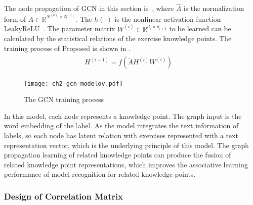 
The node propagation of GCN in this section is~\eqname{\ref{fml:ch2-gcn2}}, where \(\widehat{A}\) is the normalization form of \(A\in \mathbb{R}^{N^{(v)}\times N^{(v)}}\). The \(h(\cdot)\) is the nonlinear activation function LeakyReLU~\cite{maas2013rectifier}. The parameter matrix \(W^{(i)}\in \mathbb{R}^{d_{i}\times d_{i+1}}\) to be learned can be calculated by the statistical relations of the exercise knowledge points. The training process of Proposed is shown in \figname{\ref{fig:ch2-gcn-explain}}.
\begin{align}
    \begin{split}
        H^{(i+1)} = f(\tilde{A}H^{(i)}W^{(i)})\label{fml:ch2-gcn2}
    \end{split}
\end{align}

\begin{figure}[htbp!]
    \centering
    \texttt{[image: ch2-gcn-modelov.pdf]}
    \caption{The GCN training process}\label{fig:ch2-gcn-explain}
\end{figure}

In this model, each node represents a knowledge point. The graph input is the word embedding of the label. As the model integrates the text information of labels, so each node has latent relation with exercises represented with a text representation vector, which is the underlying principle of this model. The graph propagation learning of related knowledge points can produce the fusion of related knowledge point representations, which improves the associative learning performance of model recognition for related knowledge points.

\subsubsection{Design of Correlation Matrix}

